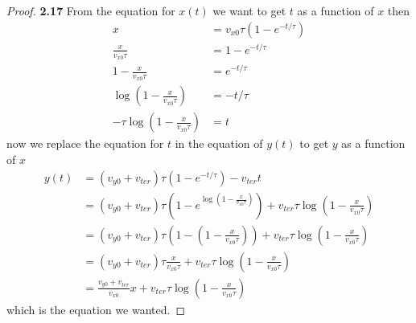 \documentclass[11pt]{article}
\theoremstyle{definition}
\begin{document}
	\begin{proof}{\textbf{2.17}}
        From the equation for $x(t)$ we want to get $t$ as a function of $x$
        then
        \begin{align*}
            x &= v_{x0}\tau(1 - e^{-t/\tau})\\
            \frac{x}{v_{x0}\tau} &= 1 - e^{-t/\tau}\\
            1 - \frac{x}{v_{x0}\tau} &= e^{-t/\tau}\\
            \log(1 - \frac{x}{v_{x0}\tau}) &= -t/\tau\\
            -\tau \log(1 - \frac{x}{v_{x0}\tau}) &= t
        \end{align*}
        now we replace the equation for $t$ in the equation of $y(t)$ to get
        $y$ as a function of $x$
        \begin{align*}
            y(t) &= (v_{y0} + v_{ter})\tau(1 - e^{-t/\tau}) - v_{ter}t\\
                 &= (v_{y0} + v_{ter})\tau(1 - e^{\log(1 - \frac{x}{v_{x0}\tau})})
                 + v_{ter}\tau \log(1 - \frac{x}{v_{x0}\tau})\\
                 &= (v_{y0} + v_{ter})\tau(1 - (1 - \frac{x}{v_{x0}\tau}))
                 + v_{ter}\tau \log(1 - \frac{x}{v_{x0}\tau})\\
                 &= (v_{y0} + v_{ter})\tau\frac{x}{v_{x0}\tau}
                 + v_{ter}\tau \log(1 - \frac{x}{v_{x0}\tau})\\
                 &= \frac{v_{y0} + v_{ter}}{v_{x0}}x
                 + v_{ter}\tau \log(1 - \frac{x}{v_{x0}\tau})
        \end{align*}
        which is the equation we wanted. 
    \end{proof}
\end{document}
